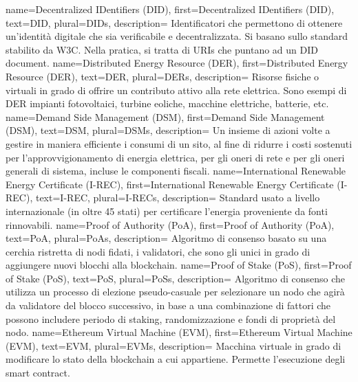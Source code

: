 {
    name={Decentralized IDentifiers (DID)},
    first={Decentralized IDentifiers (DID)},
    text={DID},
    plural={DIDs},
    description={ 
        Identificatori che permettono di ottenere un'identità digitale che sia verificabile e decentralizzata. 
        Si basano sullo standard stabilito da W3C. 
        Nella pratica, si tratta di URIs che puntano ad un DID document. 
    }
}
{
    name={Distributed Energy Resource (DER)},
    first={Distributed Energy Resource (DER)},
    text={DER},
    plural={DERs},
    description={ 
        Risorse fisiche o virtuali in grado di offrire un contributo attivo alla rete elettrica. 
        Sono esempi di DER impianti fotovoltaici, turbine eoliche, macchine elettriche, batterie, etc. 
    }
}
{
    name={Demand Side Management (DSM)},
    first={Demand Side Management (DSM)},
    text={DSM},
    plural={DSMs},
    description={ 
        Un insieme di azioni volte a gestire in maniera efficiente i consumi di un sito, 
        al fine di ridurre i costi sostenuti per l’approvvigionamento di energia elettrica, 
        per gli oneri di rete e per gli oneri generali di sistema, incluse le componenti fiscali. 
    }
}
{
    name={International Renewable Energy Certificate (I-REC)},
    first={International Renewable Energy Certificate (I-REC)},
    text={I-REC},
    plural={I-RECs},
    description={ 
        Standard usato a livello internazionale (in oltre 45 stati) per certificare l'energia proveniente da fonti rinnovabili. 
    }
}
{
    name={Proof of Authority (PoA)},
    first={Proof of Authority (PoA)},
    text={PoA},
    plural={PoAs},
    description={ 
        Algoritmo di consenso basato su una cerchia ristretta di nodi fidati, i validatori, 
        che sono gli unici in grado di aggiungere nuovi blocchi alla blockchain. 
    }
}
{
    name={Proof of Stake (PoS)},
    first={Proof of Stake (PoS)},
    text={PoS},
    plural={PoSs},
    description={ 
        Algoritmo di consenso che utilizza un processo di elezione pseudo-casuale per selezionare un nodo che agirà da validatore del blocco successivo, 
        in base a una combinazione di fattori che possono includere periodo di staking, randomizzazione e fondi di proprietà del nodo. 
    }
}
{
    name={Ethereum Virtual Machine (EVM)},
    first={Ethereum Virtual Machine (EVM)},
    text={EVM},
    plural={EVMs},
    description={ 
        Macchina virtuale in grado di modificare lo stato della blockchain a cui appartiene. 
        Permette l'esecuzione degli smart contract. 
    }
}

